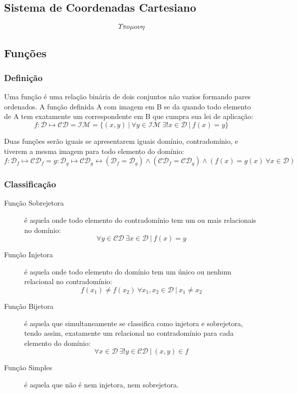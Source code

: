 \subsection{Sistema de Coordenadas Cartesiano}
    \[ \Upsilon \pi o \mu o \nu \eta \]
\subsection{Funções}
    \subsubsection{Definição}
        Uma função é uma relação binária de dois conjuntos não vazios formando pares ordenados. A função definida A com imagem em B se da quando todo elemento de A tem exatamente um correspondente em B que cumpra sua lei de aplicação:
        \[ f:\mathcal{D} \mapsto \mathcal{CD} = \mathcal{IM} = \{ (x,y) \ | \ \forall y \in \mathcal{IM} \ \exists! x \in \mathcal{D} \ | \ f(x) = y \} \]

        Duas funções serão iguais se apresentarem iguais domínio, contradomínio, e tiverem a mesma imagem para todo elemento do domínio:
        \[ f:\mathcal{D}_f \mapsto \mathcal{CD}_f = g:\mathcal{D}_g \mapsto \mathcal{CD}_g \leftrightarrow (\mathcal{D}_f = \mathcal{D}_g) \wedge (\mathcal{CD}_f = \mathcal{CD}_g) \wedge (f(x) = g(x) \ \forall x \in \mathcal{D}) \]
    \subsubsection{Classificação}
        \begin{description}
            \item[Função Sobrejetora] é aquela onde todo elemento do contradomínio tem um ou mais relacionais no domínio:
            \[ \forall y \in \mathcal{CD} \ \exists x \in \mathcal{D} \ | \ f(x) = y \]
            \item[Função Injetora] é aquela onde todo elemento do domínio tem um único ou nenhum relacional no contradomínio:
            \[ f(x_1) \neq f(x_2) \ \forall x_1, x_2 \in \mathcal{D} \ | \ x_1 \neq x_2 \]
            \item[Função Bijetora] é aquela que simultaneamente se classifica como injetora e sobrejetora, tendo assim, exatamente um relacional no contradomínio para cada elemento do domínio:
            \[ \forall x \in \mathcal{D} \ \exists! y \in \mathcal{CD} \ | \ (x,y) \in f \]
            \item[Função Simples] é aquela que não é nem injetora, nem sobrejetora. 
        \end{description}
